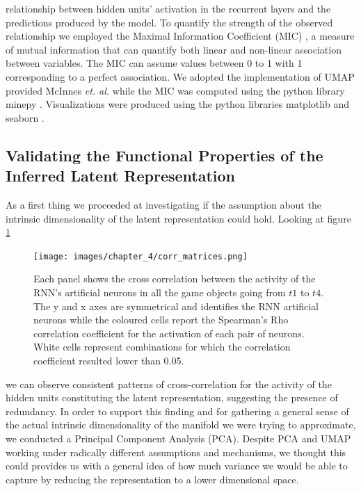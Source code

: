 relationship between hidden units' activation in the recurrent layers and the predictions produced by the model. To quantify the strength of the observed relationship we employed the Maximal Information Coefficient (MIC) \cite{reshef2011detecting}, a measure of mutual information that can quantify both linear and non-linear association between variables. The MIC can assume values between 0 to 1 with 1 corresponding to a perfect association. We adopted the implementation of UMAP provided McInnes \textit{et. al.} \cite{mcinnes2018umap-software} while the MIC was computed using the python library minepy \cite{albanese2013minerva}. Visualizations were produced using the python libraries matplotlib \cite{hunter2007matplotlib} and seaborn \cite{waskom2021seaborn}.

\subsection{Validating the Functional Properties of the Inferred Latent Representation}
\label{functional_properties}
As a first thing we proceeded at investigating if the assumption about the intrinsic dimensionality of the latent representation could hold. Looking at figure \ref{cross_corr_act}
\begin{figure}[h]
\centering
\texttt{[image: images/chapter\_4/corr\_matrices.png]}
\caption[\textbf{Cross-correlation analysis of the hidden units activation of the RNN architecture}]{Each panel shows the cross correlation between the activity of the RNN's artificial neurons in all the game objects going from $t1$ to $t4$. The y and x axes are symmetrical and identifies the RNN artificial neurons while the coloured cells report the Spearman's Rho correlation coefficient for the activation of each pair of neurons. White cells represent combinations for which the correlation coefficient resulted lower than 0.05.}
\label{cross_corr_act} 
\end{figure}

we can observe consistent patterns of cross-correlation for the activity of the hidden units constituting the latent representation, suggesting the presence of redundancy. In order to support this finding and for gathering a general sense of the actual intrinsic dimensionality of the manifold we were trying to approximate, we  conducted a Principal Component Analysis (PCA). Despite PCA and UMAP working under radically different assumptions and mechanisms, we thought this could provides us with a general idea of how much variance we would be able to capture by reducing the representation to a lower dimensional space. 

